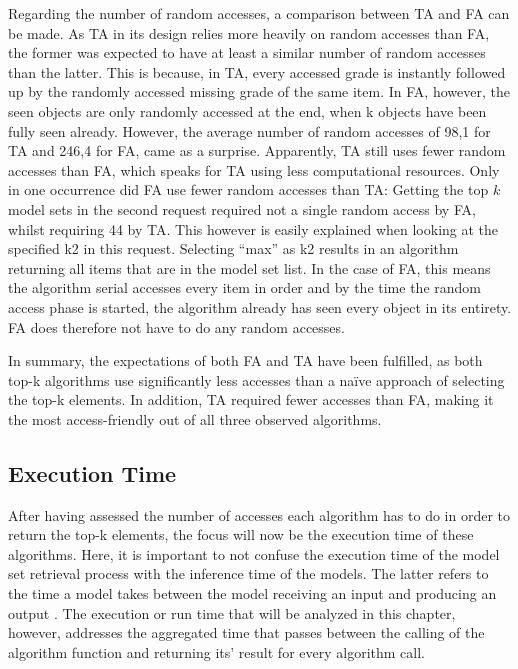 Regarding the number of random accesses, a comparison between TA and FA can be made. As TA in its design relies more heavily on random accesses than FA, the former was expected to have at least a similar number of random accesses than the latter. This is because, in TA, every accessed grade is instantly followed up by the randomly accessed missing grade of the same item. In FA, however, the seen objects are only randomly accessed at the end, when k objects have been fully seen already. However, the average number of random accesses of 98,1 for TA and 246,4 for FA, came as a surprise. Apparently, TA still uses fewer random accesses than FA, which speaks for TA using less computational resources. Only in one occurrence did FA use fewer random accesses than TA: Getting the top $k$ model sets in the second request required not a single random access by FA, whilst requiring 44 by TA. This however is easily explained when looking at the specified k2 in this request. Selecting “max” as k2 results in an algorithm returning all items that are in the model set list. In the case of FA, this means the algorithm serial accesses every item in order and by the time the random access phase is started, the algorithm already has seen every object in its entirety. FA does therefore not have to do any random accesses.

In summary, the expectations of both FA and TA have been fulfilled, as both top-k algorithms use significantly less accesses than a naïve approach of selecting the top-k elements. In addition, TA required fewer accesses than FA, making it the most access-friendly out of all three observed algorithms. 



\subsection{Execution Time}

After having assessed the number of accesses each algorithm has to do in order to return the top-k elements, the focus will now be the execution time of these algorithms. Here, it is important to not confuse the execution time of the model set retrieval process with the inference time of the models. The latter refers to the time a model takes between the model receiving an input and producing an output \cite{marco2019}. The execution or run time that will be analyzed in this chapter, however, addresses the aggregated time that passes between the calling of the algorithm function and returning its’ result for every algorithm call. 

